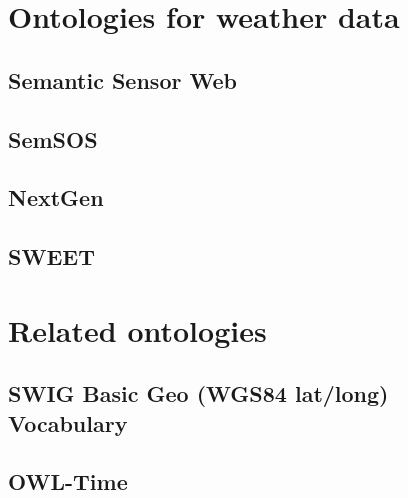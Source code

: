 \section{Ontologies for weather data}

\subsection{Semantic Sensor Web}

\subsection{SemSOS}

\subsection{NextGen}

\subsection{SWEET}

\section{Related ontologies}

\subsection{SWIG Basic Geo (WGS84 lat/long) Vocabulary}

\subsection{OWL-Time}

